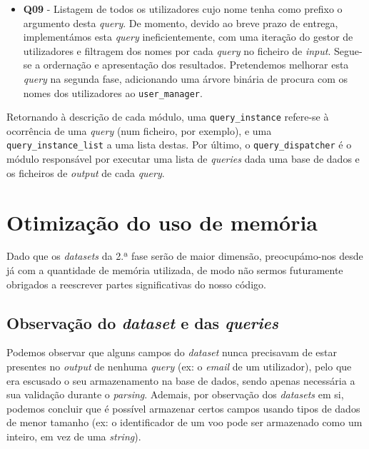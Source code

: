 \documentclass[12pt, a4paper]{article}
\begin{document}
\begin{itemize}
    \item \textbf{Q09} - Listagem de todos os utilizadores cujo nome tenha como prefixo o argumento
                         desta \emph{query}. De momento, devido ao breve prazo de entrega,
                         implementámos esta \emph{query} ineficientemente, com uma iteração do
                         gestor de utilizadores e filtragem dos nomes por cada \emph{query} no
                         ficheiro de \emph{input}. Segue-se a ordernação e apresentação dos
                         resultados. Pretendemos melhorar esta \emph{query} na segunda fase,
                         adicionando uma árvore binária de procura com os nomes dos utilizadores
                         ao \texttt{user\_manager}.
\end{itemize}

Retornando à descrição de cada módulo, uma \texttt{query\_instance} refere-se à ocorrência de uma
\emph{query} (num ficheiro, por exemplo), e uma \texttt{query\_instance\_list} a uma lista destas.
Por último, o \texttt{query\_dispatcher} é o módulo responsável por executar uma lista de
\emph{queries} dada uma base de dados e os ficheiros de \emph{output} de cada \emph{query}.

\section{Otimização do uso de memória}

Dado que os \emph{datasets} da 2.ª fase serão de maior dimensão, preocupámo-nos desde já com a
quantidade de memória utilizada, de modo não sermos futuramente obrigados a reescrever partes
significativas do nosso código.

\subsection{Observação do \emph{dataset} e das \emph{queries}}

Podemos observar que alguns campos do \emph{dataset} nunca precisavam de estar presentes no
\emph{output} de nenhuma \emph{query} (ex: o \emph{email} de um utilizador), pelo que era escusado
o seu armazenamento na base de dados, sendo apenas necessária a sua validação durante o
\emph{parsing}. Ademais, por observação dos \emph{datasets} em si, podemos concluir que é possível
armazenar certos campos usando tipos de dados de menor tamanho (ex: o identificador de um voo
pode ser armazenado como um inteiro, em vez de uma \emph{string}).
\end{document}
